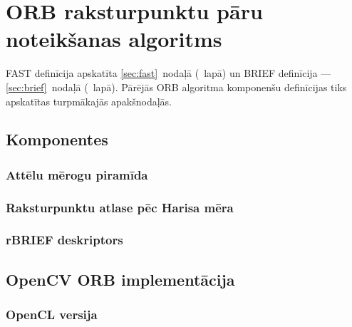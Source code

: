 \section{ORB raksturpunktu pāru noteikšanas algoritms}\label{sec:orb}
\lipsum[28-28]

FAST definīcija apskatīta \ref{sec:fast}~nodaļā
(\pageref{sec:fast}~lapā) un BRIEF definīcija --- \ref{sec:brief}~nodaļā
(\pageref{sec:brief}~lapā). Pārējās ORB algoritma komponenšu definīcijas
tiks apskatītas turpmākajās apakšnodaļās.

\subsection{Komponentes}
\subsubsection{Attēlu mērogu piramīda}
\lipsum[29-29]

\subsubsection{Raksturpunktu atlase pēc Harisa mēra}
\lipsum[30-30]



\subsubsection{rBRIEF deskriptors} \label{sec:rbrief-def}
\lipsum[31-31]


\subsection{OpenCV ORB implementācija}
\lipsum[32-32]
\subsubsection{OpenCL versija}
\lipsum[33-33]

